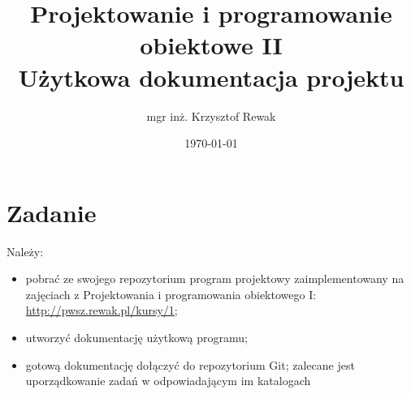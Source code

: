 \documentclass{article}
\title{
	Projektowanie i programowanie obiektowe II\\
	\Huge{Użytkowa dokumentacja projektu}
}
\author{mgr inż. Krzysztof Rewak}
\date{\today}
\begin{document}
	\maketitle
	
	\section{Zadanie}
	Należy:
	\begin{itemize}
		\item pobrać ze swojego repozytorium program projektowy zaimplementowany na zajęciach z Projektowania i programowania obiektowego I: \url{http://pwsz.rewak.pl/kursy/1};
		\item utworzyć dokumentację użytkową programu;
		\item gotową dokumentację dołączyć do repozytorium Git; zalecane jest uporządkowanie zadań w odpowiadającym im katalogach
	\end{itemize}
\end{document}
